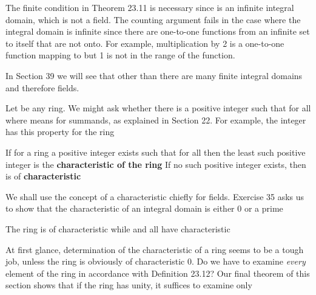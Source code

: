 \documentclass[11pt,oneside]{article}
\begin{document}
\begin{BookBody}

The finite condition in Theorem 23.11 is necessary since  is an infinite integral domain, which is not a field. The counting argument fails in the case where the integral domain is infinite since there are one-to-one functions from an infinite set to itself that are not onto. For example, multiplication by 2 is a one-to-one function mapping  to  but 1 is not in the range of the function.

In Section 39 we will see that other than  there are many finite integral domains and therefore fields.


\noindent Let  be any ring. We might ask whether there is a positive integer  such that  for all  where  means  for  summands, as explained in Section 22. For example, the integer  has this property for the ring 

 If for a ring  a positive integer  exists such that  for all  then the least such positive integer is the\textbf{ characteristic of the ring}  If no such positive integer exists, then  is of\textbf{ characteristic} \BookEnd{\blacksquare}

We shall use the concept of a characteristic chiefly for fields. Exercise 35 asks us to show that the characteristic of an integral domain is either 0 or a prime 

 The ring  is of characteristic  while  and  all have characteristic \BookEnd{\blacktriangle}

At first glance, determination of the characteristic of a ring seems to be a tough job, unless the ring is obviously of characteristic 0. Do we have to examine\textit{ every} element  of the ring in accordance with Definition 23.12? Our final theorem of this section shows that if the ring has unity, it suffices to examine only 


\end{BookBody}
\end{document}
